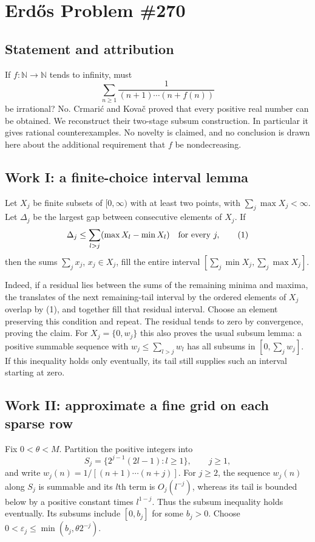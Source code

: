 \section{Erd\H{o}s Problem \#270}
\subsection{Statement and attribution}
If $f:\mathbb N\to\mathbb N$ tends to infinity, must
\[
 \sum_{n\ge1}\frac1{(n+1)\cdots(n+f(n))}
\]
be irrational? No. Crmari\'c and Kova\v c proved that every positive real number can be obtained. We reconstruct their two-stage subsum construction. In particular it gives rational counterexamples. No novelty is claimed, and no conclusion is drawn here about the additional requirement that $f$ be nondecreasing.

\subsection{Work I: a finite-choice interval lemma}
Let $X_j$ be finite subsets of $[0,\infty)$ with at least two points, with $\sum_j\max X_j<\infty$. Let $\Delta_j$ be the largest gap between consecutive elements of $X_j$. If
\[
 \Delta_j\le\sum_{l>j}(\max X_l-\min X_l)\quad\hbox{for every }j,
 \tag{1}
\]
then the sums $\sum_jx_j$, $x_j\in X_j$, fill the entire interval
$[\sum_j\min X_j,\sum_j\max X_j]$.

Indeed, if a residual lies between the sums of the remaining minima and maxima, the translates of the next remaining-tail interval by the ordered elements of $X_j$ overlap by (1), and together fill that residual interval. Choose an element preserving this condition and repeat. The residual tends to zero by convergence, proving the claim.
For $X_j=\{0,w_j\}$ this also proves the usual subsum lemma: a positive summable sequence with $w_j\le\sum_{l>j}w_l$ has all subsums in $[0,\sum_jw_j]$. If this inequality holds only eventually, its tail still supplies such an interval starting at zero.

\subsection{Work II: approximate a fine grid on each sparse row}
Fix $0<\theta<M$. Partition the positive integers into
\[
 S_j=\{2^{j-1}(2l-1):l\ge1\},\qquad j\ge1,
\]
and write $w_j(n)=1/[(n+1)\cdots(n+j)]$.
For $j\ge2$, the sequence $w_j(n)$ along $S_j$ is summable and its $l$th term is $O_j(l^{-j})$, whereas its tail is bounded below by a positive constant times $l^{1-j}$. Thus the subsum inequality holds eventually. Its subsums include $[0,b_j]$ for some $b_j>0$. Choose
$0<\varepsilon_j\le\min(b_j,\theta2^{-j})$.

